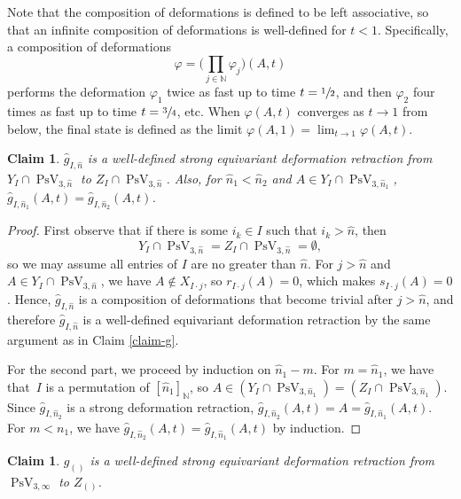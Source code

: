 \documentclass[JEP,XML,SOM,Unicode,NoFloatCountersInSection,published]{cedram}
\let\nicefrac\sfrac
\newtheorem{claim}[theorem]{Claim}
\theoremstyle{remark}
\let\mb\mathbb
\let\phi\varphi
\DeclareMathOperator{\pstief}{PsV}
\begin{document}
Note that the composition of deformations is defined to be left associative, so that an infinite composition of deformations is well-defined for $t<1$. Specifically, a composition of deformations
\[\phi = \biggl(\prod_{j \in \mb{N}} \phi_j\biggr) (A,t) \]
performs the deformation $\phi_1$ twice as fast up to time $t = \nicefrac{1}{2}$, and then $\phi_2$ four times as fast up to time $t = \nicefrac{3}{4}$, etc.
When $\phi(A,t)$ converges as $t \to 1$ from below, the final state is defined as the limit $\phi(A,1) = \lim_{t \to 1} \phi(A,t)$.

\begin{claim}\label{claim-consistent-g}
$\hat g_{I,\hat n}$ is a well-defined strong equivariant deformation retraction from $Y_I \cap \pstief_{3,\hat n}$ to $Z_I \cap \pstief_{3,\hat n}$.
Also, for $\hat n_1 < \hat n_2$ and $A \in Y_I \cap \pstief_{3,\hat n_1}$, $\hat g_{I,\hat n_1}(A,t) = \hat g_{I,\hat n_2}(A,t)$.
\end{claim}

\begin{proof}
First observe that if there is some $i_k \in I$ such that $i_k > \hat n$, then
\[
Y_I \cap \pstief_{3,\hat n} = Z_I \cap \pstief_{3,\hat n} = \emptyset,
\]
so we may assume all entries of $I$ are no greater than $\hat n$.
For $j > \hat n$ and \hbox{$A \in Y_I \cap \pstief_{3,\hat n}$}, we have $A \not \in X_{I\cdot j}$, so $r_{I\cdot j}(A) = 0$, which makes $s_{I\cdot j}(A) = 0$. Hence, $\hat g_{I,\hat n}$ is a composition of deformations that become trivial after $j > \hat n$, and therefore $\hat g_{I,\hat n}$ is a well-defined equivariant deformation retraction by the same argument as in Claim \ref{claim-g}.

For the second part, we proceed by induction on $\hat n_1 -m$.
For $m = \hat n_1$, we have that~$I$ is a permutation of $[\hat n_1]_\mb{N}$, so $A \in (Y_I \cap \pstief_{3,\hat n_1}) = (Z_I \cap \pstief_{3,\hat n_1})$. Since $\hat g_{I,\hat n_2}$ is a strong deformation retraction, $\hat g_{I,\hat n_2}(A,t) = A = \hat g_{I,\hat n_1}(A,t)$. For $m < n_1$, we have $\hat g_{I,\hat n_2}(A,t) = \hat g_{I,\hat n_1}(A,t)$ by induction.
\end{proof}

\begin{claim}\label{claim-infinite-g}
$g_{()}$ is a well-defined strong equivariant deformation retraction from $\pstief_{3,\infty}$ to $Z_{()}$.
\end{claim}
\end{document}
